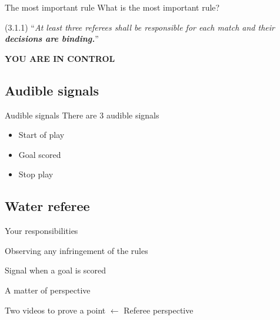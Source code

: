 \documentclass{beamer}
\begin{document}
    \begin{frame}{The most important rule}
        What is the most important rule?

        \vspace{0.75cm}

        \pause

        (3.1.1) ``\textit{At least three referees shall be responsible for each match and their \textbf{decisions are
binding.}}''

        \pause

        \begin{center}
            \textbf{\uppercase{You are in control}}
        \end{center}
    \end{frame}

    \subsection{Audible signals}

    \begin{frame}{Audible signals}
        There are 3 audible signals \pause
        \begin{itemize}
            \item Start of play \pause
            \item Goal scored \pause
            \item Stop play
        \end{itemize}
    \end{frame}

    \subsection{Water referee}
    \begin{frame}{Your responsibilities}
        \begin{center}
            Observing any infringement of the rules

            Signal when a goal is scored
        \end{center}
    \end{frame}

    \begin{frame}{A matter of perspective}
        \begin{center}
            Two videos to prove a point $\leftarrow$ Referee perspective
        \end{center}
    \end{frame}
\end{document}
